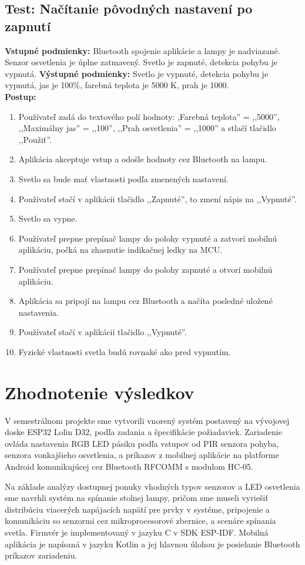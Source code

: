 \documentclass[12pt, a4paper]{article}
\begin{document}
\subsection{Test: Načítanie pôvodných nastavení po zapnutí}
\noindent\textbf{Vstupné podmienky:} Bluetooth spojenie aplikácie a lampy je nadviazané. Senzor osvetlenia je úplne zatmavený. Svetlo je zapnuté, detekcia pohybu je vypnutá.
\textbf{Výstupné podmienky:} Svetlo je vypnuté, detekcia pohybu je vypnutá, jas je 100\%, farebná teplota je 5000 K, prah je 1000. \\
\textbf{Postup:}
\begin{enumerate}
\itemsep0pt
\item Používateľ zadá do textového polí hodnoty: ,Farebná teplota'' = ,,5000'', ,,Maximálny jas'' = ,,100'',  ,,Prah osvetlenia'' = ,,1000'' a stlačí tlačidlo ,,Použiť''.
\item Aplikácia akceptuje vstup a odošle hodnoty cez Bluetooth na lampu.
\item Svetlo sa bude mať vlastnosti podľa zmenených nastavení.
\item Používateľ stačí v aplikácii tlačidlo ,,Zapnuté'', to zmení nápis na ,,Vypnuté''.
\item Svetlo sa vypne.
\item Používateľ prepne prepínač lampy do polohy vypnuté a zatvorí mobilnú aplikáciu, počká na zhasnutie indikačnej ledky na MCU.
\item Používateľ prepne prepínač lampy do polohy zapnuté a otvorí mobilnú aplikáciu.
\item Aplikácia sa pripojí na lampu cez Bluetooth a načíta posledné uložené nastavenia.
\item Používateľ stačí v aplikácii tlačidlo ,,Vypnuté''.
\item Fyzické vlastnosti svetla budú rovnaké ako pred vypnutím.
\end{enumerate}

\section{Zhodnotenie výsledkov}
V semestrálnom projekte sme vytvorili vnorený systém postavený na vývojovej doske ESP32 Lolin D32, podľa zadania a špecifikácie požiadaviek. Zariadenie ovláda nastavenia RGB LED pásiku podľa vstupov od PIR senzora pohyba, senzora vonkajšieho osvetlenia, a príkazov z mobilnej aplikácie na platforme Android komunikujúcej cez Bluetooth RFCOMM s modulom HC-05.

Na základe analýzy dostupnej ponuky vhodných typov senzorov a LED osvetlenia sme navrhli systém na spínanie stolnej lampy, pričom sme museli vyriešiť distribúciu viacerých napájacích napätí pre prvky v systéme, pripojenie a komunikáciu so senzormi cez mikroprocesorové zbernice, a scenáre spínania svetla. Firmvér je implementovaný v jazyku C v SDK ESP-IDF. Mobilná aplikácia je napísaná v jazyku Kotlin a jej hlavnou úlohou je posielanie Bluetooth príkazov zariadeniu.
\end{document}
